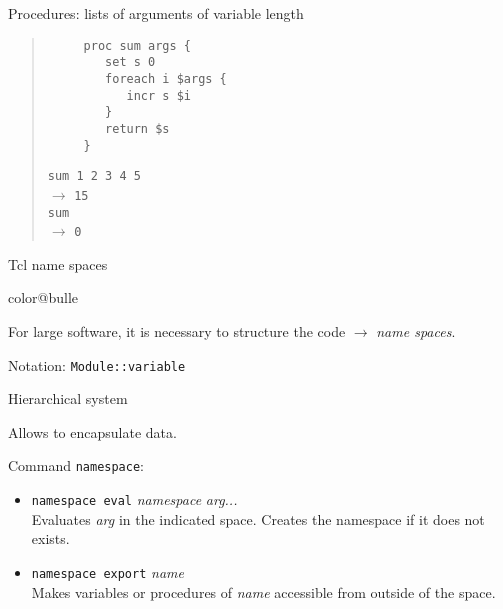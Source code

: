 \documentclass[a4paper,landscape,smooth]{show}
\newcommand{\tclex}[2]{\texttt{#1}\\$\rightarrow$ \texttt{#2}}
\begin{document}

\begin{tslide}{Procedures: lists of arguments of variable length}
   \vfill
   \begin{quote}
      \begin{verbatim}
	 proc sum args {
	    set s 0
	    foreach i $args {
	       incr s $i
	    }
	    return $s
	 }
      \end{verbatim} %
      \tclex{sum 1 2 3 4 5}{15}\\
      \tclex{sum}{0}
   \end{quote}
   \vfill
\end{tslide}


\begin{tslide}{Tcl name spaces}
   \vfill
   \begin{bitemize}{color@bulle}
      \item For large software, it is necessary to  structure the
	    code $\rightarrow$ \emph{name spaces}. 
      \item Notation: \texttt{Module::variable}
      \item Hierarchical system
      \item Allows to encapsulate data. 
      \item Command \texttt{namespace}:
	 \begin{itemize}
	    \item \texttt{namespace eval} \emph{namespace} \emph{arg...}\\
	    Evaluates \emph{arg} in the indicated space. Creates the
	    namespace if it does not exists.
	    \item \texttt{namespace export} \emph{name} \\
	    Makes variables or
	    procedures  of \emph{name} accessible from outside of the space.
	 \end{itemize}
   \end{bitemize}
   \vfill
\end{tslide}

\end{document}
